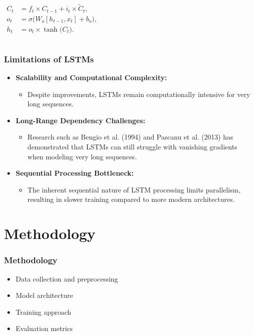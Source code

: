 \documentclass{beamer}
\begin{document}
\begin{frame}
\begin{columns}[T]
        {\small
        \[
        \begin{aligned}
            C_t &= f_t \times C_{t-1} + i_t \times \tilde{C}_t,\\[5pt]
            o_t &= \sigma\bigl(W_o [h_{t-1}, x_t] + b_o\bigr),\\[5pt]
            h_t &= o_t \times \tanh\bigl(C_t\bigr).
        \end{aligned}
        \]
        }
    \end{columns}
\end{frame}
\begin{frame}
\frametitle{Limitations of LSTMs}
\begin{itemize}
    \item \textbf{Scalability and Computational Complexity:}
    \begin{itemize}
        \item Despite improvements, LSTMs remain computationally intensive for very long sequences.
    \end{itemize}
    \item \textbf{Long-Range Dependency Challenges:}
    \begin{itemize}
        \item Research such as Bengio et al. (1994) and Pascanu et al. (2013) has demonstrated that LSTMs can still struggle with vanishing gradients when modeling very long sequences.
    \end{itemize}
    \item \textbf{Sequential Processing Bottleneck:}
    \begin{itemize}
        \item The inherent sequential nature of LSTM processing limits parallelism, resulting in slower training compared to more modern architectures.
    \end{itemize}
\end{itemize}
\end{frame}


\section{Methodology}
\begin{frame}
\frametitle{Methodology}
\begin{itemize}
    \item Data collection and preprocessing
    \item Model architecture
    \item Training approach
    \item Evaluation metrics
\end{itemize}
\end{frame}
\end{document}
